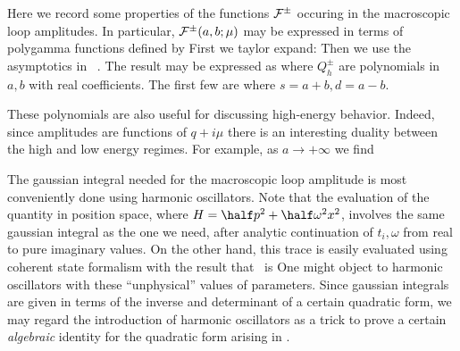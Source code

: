 Here we record some properties of the functions ${\cal F}^\pm$ 
occuring in the macroscopic loop amplitudes. 
In particular, ${\cal F}^\pm(a,b;\mu)$ 
may be expressed in terms of polygamma functions defined by
\eqn{}
First we taylor expand:
\eqn{}
Then we use the asymptotics in \plygmma\ . The result may be expressed as
\eqn{}
where $Q_h^\pm$ are polynomials in $a,b$ with real coefficients.
The first few are
\eqn{}
where $s=a+b,d=a-b$. 

These polynomials are also useful for discussing high-energy
behavior. Indeed, since amplitudes are functions of 
$q+i\mu$ there is an interesting duality between the 
high and low energy regimes. For example, as $a\to +\infty$
we find
\eqn{}


The gaussian integral needed for the macroscopic
loop amplitude is most conveniently done using 
harmonic oscillators. Note that the evaluation of 
the quantity
\eqn{}
in position space, where $H=\half p^2+\half\omega^2 x^2$,
involves the same gaussian integral as the one we need, after analytic 
continuation of $t_i,\omega$ from real to pure
imaginary values. On the other hand, this trace is
easily evaluated using coherent state formalism
with the result that \trci\ is
\eqn{}
One might object to harmonic oscillators with these 
``unphysical'' values of parameters.
Since gaussian integrals are given in terms of the 
inverse and determinant of a certain quadratic form, 
we may regard the introduction of harmonic
oscillators as a trick to prove a certain {\it algebraic}
identity for the quadratic form arising in \macropt .
 
